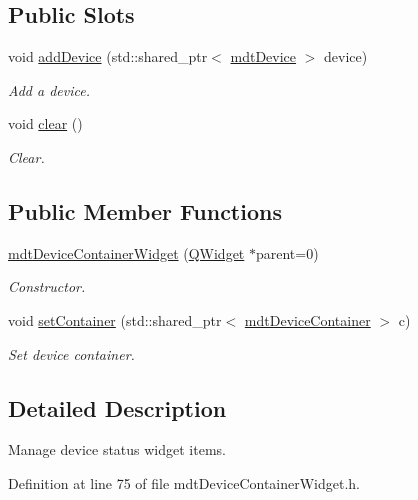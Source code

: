 \subsection*{Public Slots}
\begin{DoxyCompactItemize}
\item 
void \hyperlink{classmdt_device_container_widget_a5e627364b24ed98f401c9d8a5fec10c4}{add\-Device} (std\-::shared\-\_\-ptr$<$ \hyperlink{classmdt_device}{mdt\-Device} $>$ device)
\begin{DoxyCompactList}\small\item\em Add a device. \end{DoxyCompactList}\item 
void \hyperlink{classmdt_device_container_widget_a952e88c1473af6968be516cd5c7df965}{clear} ()
\begin{DoxyCompactList}\small\item\em Clear. \end{DoxyCompactList}\end{DoxyCompactItemize}
\subsection*{Public Member Functions}
\begin{DoxyCompactItemize}
\item 
\hyperlink{classmdt_device_container_widget_a2dbf28f5d14a70688b511546b9b829ac}{mdt\-Device\-Container\-Widget} (\hyperlink{class_q_widget}{Q\-Widget} $\ast$parent=0)
\begin{DoxyCompactList}\small\item\em Constructor. \end{DoxyCompactList}\item 
void \hyperlink{classmdt_device_container_widget_aba13958bd5001cddd7db4dca6ec39f99}{set\-Container} (std\-::shared\-\_\-ptr$<$ \hyperlink{classmdt_device_container}{mdt\-Device\-Container} $>$ c)
\begin{DoxyCompactList}\small\item\em Set device container. \end{DoxyCompactList}\end{DoxyCompactItemize}


\subsection{Detailed Description}
Manage device status widget items. 

Definition at line 75 of file mdt\-Device\-Container\-Widget.\-h.



